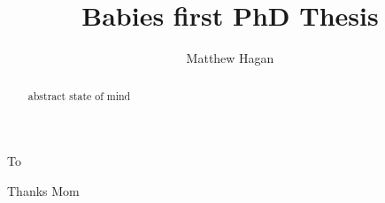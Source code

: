 \documentclass{ut-thesis}
\author{Matthew Hagan}
\title{Babies first PhD Thesis}
\begin{document}
  \frontmatter
    \maketitle
    \begin{abstract}
      abstract state of mind
    \end{abstract}
    \begin{dedication}
      To 
    \end{dedication}
    \begin{acknowledgements}
      Thanks Mom
    \end{acknowledgements}
    \tableofcontents
    \listoftables
    \listoffigures
  \mainmatter
    
    
    
    
    
  \appendix
  
  \backmatter
  \printbibliography[heading=bibintoc]
\end{document}
